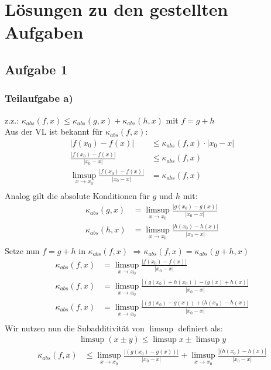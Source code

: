 \documentclass{llncs}
\begin{document}
\chapter*{L\"osungen zu den gestellten Aufgaben}

\section*{Aufgabe 1}

\subsection*{Teilaufgabe a)}
z.z.: $\kappa_{abs}(f,x)\le \kappa_{abs}(g,x) + \kappa_{abs}(h,x) $ mit $f=g+h$\\
Aus der VL ist bekannt für $\kappa_{abs}(f,x)$:\\
\begin{align*}
|f(x_0)-f(x)| &\le \kappa_{abs}(f,x) \cdot |x_0-x| \\
\frac{|f(x_0)-f(x)|}{|x_0-x|} &\le \kappa_{abs}(f,x)\\
\limsup_{x \rightarrow x_0} \frac{|f(x_0)-f(x)|}{|x_0-x|} &= \kappa_{abs}(f,x)\\
\end{align*}
Analog gilt die absolute Konditionen für $g$ und $h$ mit:\\
\begin{align*}
\kappa_{abs}(g,x)&=\limsup_{x \rightarrow x_0} \frac{|g(x_0)-g(x)|}{|x_0-x|} \\
\kappa_{abs}(h,x)&=\limsup_{x \rightarrow x_0} \frac{|h(x_0)-h(x)|}{|x_0-x|} \\
\end{align*}
Setze nun $f=g+h$ in  $\kappa_{abs}(f,x)$ $\Rightarrow \kappa_{abs}(f,x) = \kappa_{abs}(g+h,x)$
\begin{align*}
\kappa_{abs}(f,x)&= \limsup_{x \rightarrow x_0} \frac{|f(x_0)-f(x)|}{|x_0-x|} \\
\kappa_{abs}(f,x)&= \limsup_{x \rightarrow x_0} \frac{|(g(x_0)+h(x_0))-(g(x)+h(x)|}{|x_0-x|} \\
\kappa_{abs}(f,x)&= \limsup_{x \rightarrow x_0} \frac{|(g(x_0)-g(x))+(h(x_0)-h(x)|}{|x_0-x|} \\
\end{align*}
Wir nutzen nun die Subadditivität von $\limsup$ definiert als:
\begin{align*}
\limsup (x\pm y) \le \limsup x \pm \limsup y
\end{align*}
\begin{align*}
\kappa_{abs}(f,x)&\le \limsup_{x \rightarrow x_0} \frac{|(g(x_0)-g(x))|}{|x_0-x|}+\limsup_{x \rightarrow x_0} \frac{|(h(x_0)-h(x)|}{|x_0-x|} \\
\end{align*}
\end{document}
